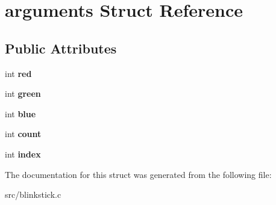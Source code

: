 \hypertarget{structarguments}{}\section{arguments Struct Reference}
\label{structarguments}
\subsection*{Public Attributes}
\begin{DoxyCompactItemize}
\item 
\mbox{\label{structarguments_a84b891043d2e65c3669a24e13526d283}} 
int {\bfseries red}
\item 
\mbox{\label{structarguments_ac17304e27f0aeff9c60ccd99272a528f}} 
int {\bfseries green}
\item 
\mbox{\label{structarguments_a70b73cc3e5b1eb56971047837502e888}} 
int {\bfseries blue}
\item 
\mbox{\label{structarguments_aed87526922d7dc35bd4030561e3543ca}} 
int {\bfseries count}
\item 
\mbox{\label{structarguments_ae49f614707fea7e9a8fb5e04dadb201d}} 
int {\bfseries index}
\end{DoxyCompactItemize}


The documentation for this struct was generated from the following file\+:\begin{DoxyCompactItemize}
\item 
src/blinkstick.\+c\end{DoxyCompactItemize}

